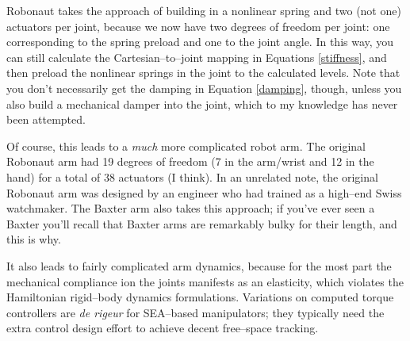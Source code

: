 \documentclass[]{article}
\begin{document}
Robonaut takes the approach of building in a nonlinear spring and two (not one) actuators per joint, because we now have two degrees of freedom per joint: one corresponding to the spring preload and one to the joint angle. In this way, you can still calculate the Cartesian--to--joint mapping in Equations \ref{stiffness}, and then preload the nonlinear springs in the joint to the calculated levels. Note that you don't necessarily get the damping in Equation \ref{damping}, though, unless you also build a mechanical damper into the joint, which to my knowledge has never been attempted.

Of course, this leads to a \textit{much} more complicated robot arm. The original Robonaut arm had 19 degrees of freedom (7 in the arm/wrist and 12 in the hand) for a total of 38 actuators (I think). In an unrelated note, the original Robonaut arm was designed by an engineer who had trained as a high--end Swiss watchmaker. The Baxter arm also takes this approach; if you've ever seen a Baxter you'll recall that Baxter arms are remarkably bulky for their length, and this is why.

It also leads to fairly complicated arm dynamics, because for the most part the mechanical compliance ion the joints manifests as an elasticity, which violates the Hamiltonian rigid--body dynamics formulations. Variations on computed torque controllers are \textit{de rigeur} for SEA--based manipulators; they typically need the extra control design effort to achieve decent free--space tracking.
\end{document}
